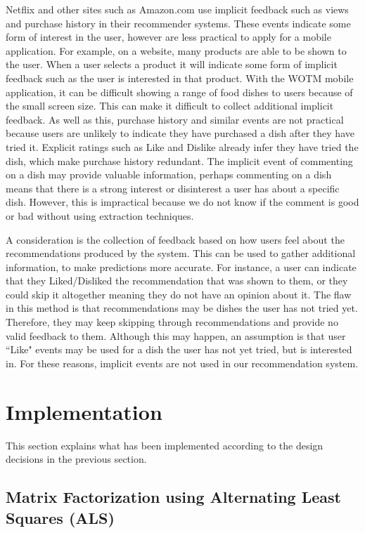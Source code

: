 Netflix \cite{koren2009matrix} and other sites such as Amazon.com \cite{schafer2007collaborative} use implicit feedback such as views and purchase history in their recommender systems. These events indicate some form of interest in the user, however are less practical to apply for a mobile application. For example, on a website, many products are able to be shown to the user. When a user selects a product it will indicate some form of implicit feedback such as the user is interested in that product. With the WOTM mobile application, it can be difficult showing a range of food dishes to users because of the small screen size. This can make it difficult to collect additional implicit feedback. As well as this, purchase history and similar events are not practical because users are unlikely to indicate they have purchased a dish after they have tried it. Explicit ratings such as Like and Dislike already infer they have tried the dish, which make purchase history redundant. The implicit event of commenting on a dish may provide valuable information, perhaps commenting on a dish means that there is a strong interest or disinterest a user has about a specific dish. However, this is impractical because we do not know if the comment is good or bad without using extraction techniques.

A consideration is the collection of feedback based on how users feel about the recommendations produced by the system. This can be used to gather additional information, to make predictions more accurate. For instance, a user can indicate that they Liked/Disliked the recommendation that was shown to them, or they could skip it altogether meaning they do not have an opinion about it. The flaw in this method is that recommendations may be dishes the user has not tried yet. Therefore, they may keep skipping through recommendations and provide no valid feedback to them. Although this may happen, an assumption is that user ``Like" events may be used for a dish the user has not yet tried, but is interested in. For these reasons, implicit events are not used in our recommendation system.

\section{Implementation}

This section explains what has been implemented according to the design decisions in the previous section.

\subsection{Matrix Factorization using Alternating Least Squares (ALS)}

